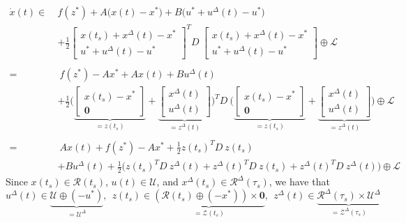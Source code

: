 \documentclass{article}
\begin{document}
\begin{equation}
	\begin{split}
	\dot x(t) \in ~ & f(z^*) + A \big( x(t) - x^* \big) + B \big( u^* + u^{\Delta}(t) - u^* \big) \\
	& + \frac{1}{2} \begin{bmatrix} x(t_s) + x^{\Delta}(t) - x^* \\ u^* + u^{\Delta}(t) - u^* \end{bmatrix}^T D ~ \begin{bmatrix} x(t_s) + x^{\Delta}(t) - x^* \\ u^* + u^{\Delta}(t) - u^* \end{bmatrix} \oplus \mathcal{L} \\
	& ~ \\
	= & ~ f(z^*) - A x^* + A x(t) + B u^{\Delta}(t) \\ & 
	+ \frac{1}{2} \bigg( \underbrace{\begin{bmatrix} x(t_s) - x^* \\ \mathbf{0} \end{bmatrix}}_{= z(t_s)} + \underbrace{\begin{bmatrix} x^{\Delta}(t) \\ u^{\Delta}(t) \end{bmatrix}}_{=z^{\Delta}(t)} \bigg)^T D ~ \bigg( \underbrace{\begin{bmatrix} x(t_s) - x^* \\ \mathbf{0} \end{bmatrix}}_{= z(t_s)} + \underbrace{\begin{bmatrix} x^{\Delta}(t) \\ u^{\Delta}(t) \end{bmatrix}}_{=z^{\Delta}(t)} \bigg) \oplus \mathcal{L} \\
	& ~ \\
	= & ~ A x(t) + f(z^*) - A x^* + \frac{1}{2} z(t_s)^T D ~ z(t_s) \\
	& + B u^{\Delta}(t) + \frac{1}{2}\big( z(t_s)^T D~ z^{\Delta}(t) + z^{\Delta}(t)^T D ~z(t_s) + z^{\Delta}(t)^T D ~z^{\Delta}(t) \big) \oplus \mathcal{L}
	\end{split}
	\label{eq:taylorSplit}
\end{equation}
Since $x(t_s) \in \mathcal{R}(t_s)$, $u(t) \in \mathcal{U}$, and $x^{\Delta}(t_s) \in \mathcal{R}^{\Delta}(\tau_s)$, we have that
\begin{equation}
	u^{\Delta}(t) \in \underbrace{ \mathcal{U} \oplus (-u^*)}_{= \mathcal{U}^{\Delta}}, ~~ z(t_s) \in \underbrace{(\mathcal{R}(t_s) \oplus (-x^*)) \times \mathbf{0}}_{= \mathcal{Z}(t_s)}, ~~ z^{\Delta}(t) \in \underbrace{\mathcal{R}^{\Delta}(\tau_s) \times \mathcal{U}^{\Delta}}_{= \mathcal{Z}^{\Delta}(\tau_s)}
	\label{eq:sets}
\end{equation}
\end{document}
